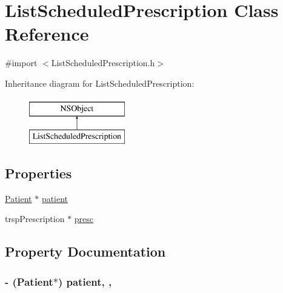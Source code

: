 \hypertarget{interface_list_scheduled_prescription}{}\section{List\+Scheduled\+Prescription Class Reference}
\label{interface_list_scheduled_prescription}


{\ttfamily \#import $<$List\+Scheduled\+Prescription.\+h$>$}

Inheritance diagram for List\+Scheduled\+Prescription\+:\begin{figure}[H]
\begin{center}
\leavevmode
\includegraphics[height=2.000000cm]{interface_list_scheduled_prescription}
\end{center}
\end{figure}
\subsection*{Properties}
\begin{DoxyCompactItemize}
\item 
\hyperlink{interface_patient}{Patient} $\ast$ \hyperlink{interface_list_scheduled_prescription_a02b41bc42684aef8bdbcaab4231be67d}{patient}
\item 
trsp\+Prescription $\ast$ \hyperlink{interface_list_scheduled_prescription_a68dd72c38108b398acd9b3ce600d767a}{presc}
\end{DoxyCompactItemize}


\subsection{Property Documentation}
\hypertarget{interface_list_scheduled_prescription_a02b41bc42684aef8bdbcaab4231be67d}{}
\subsubsection[{patient}]{\setlength{\rightskip}{0pt plus 5cm}-\/ ({\bf Patient}$\ast$) patient\hspace{0.3cm}{\ttfamily [read]}, {\ttfamily [write]}, {\ttfamily [atomic]}}\label{interface_list_scheduled_prescription_a02b41bc42684aef8bdbcaab4231be67d}
\hypertarget{interface_list_scheduled_prescription_a68dd72c38108b398acd9b3ce600d767a}{}
